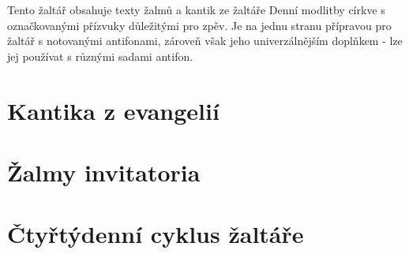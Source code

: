 \documentclass[a5paper, twoside]{article}
\begin{document}


\titulniStrankaSvazkuAntifonare

Tento žaltář obsahuje texty žalmů a kantik ze žaltáře
Denní modlitby církve s označkovanými přízvuky důležitými
pro zpěv.
Je na jednu stranu přípravou pro žaltář s notovanými antifonami,
zároveň však jeho univerzálnějším doplňkem - lze jej používat
s různými sadami antifon.

% 

\setlength{\columnseprule}{1pt} %
\setlength{\columnsep}{20pt} %

\fancyhead{}
\fancyhead[LE,RO]{\thepage}
\fancyfoot{}

\pagestyle{fancy}

\section*{Kantika z evangelií}




\section*{Žalmy invitatoria}






\clearpage
\section*{Čtyřtýdenní cyklus žaltáře}



\nesporyI





\ranniChvaly





\modlitbaUprostredDne





\nesporyII





\ranniChvaly



\clearpage
\pagestyle{plain}
\tirazSvazkuAntifonare
\end{document}
